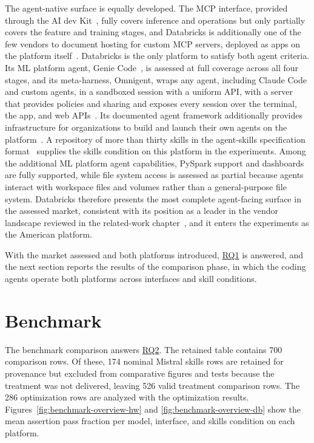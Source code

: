 \documentclass[
english,                 %
bibtex,                  %
]{kththesis}
\newcommand*{\retainedComparisonCount}{700}
\newcommand*{\retainedOptimizationCount}{286}
\newcommand*{\treatmentValidComparisonCount}{526}
\newcommand*{\excludedSkillCount}{174}
\numberwithin{listing}{chapter}
\begin{document}
The agent-native surface is equally developed. The \gls{MCP} interface, provided through the \gls{AI} \Gls{dev} Kit~\cite{databricks_databricks-solutionsai-dev-kit_2026}, fully covers inference and operations but only partially covers the feature and training stages, and Databricks is additionally one of the few vendors to document hosting for custom \gls{MCP} servers, deployed as apps on the platform itself~\cite{databricks_use_2026}. Databricks is the only platform to satisfy both agent criteria. Its \gls{ML} platform agent, Genie Code~\cite{wendell_introducing_2026}, is assessed at full coverage across all four stages, and its meta-harness, Omnigent, wraps any agent, including Claude Code and custom agents, in a sandboxed session with a uniform \gls{API}, with a server that provides policies and sharing and exposes every session over the terminal, the app, and web \glspl{API}~\cite{zaharia_introducing_2026, ball_altimeter_2026}. Its documented agent framework additionally provides infrastructure for organizations to build and launch their own agents on the platform~\cite{databricks_use_2026}. A repository of more than thirty skills in the agent-skills specification format~\cite{databricks_databricksdatabricks-agent-skills_2026} supplies the skills condition on this platform in the experiments. Among the additional \gls{ML} platform agent capabilities, PySpark support and dashboards are fully supported, while file system access is assessed as partial because agents interact with workspace files and volumes rather than a general-purpose file system. Databricks therefore presents the most complete agent-facing surface in the assessed market, consistent with its position as a leader in the vendor landscape reviewed in the related-work chapter~\cite{jaffri_magic_2025}, and it enters the experiments as the American platform.

With the market assessed and both platforms introduced, \hyperref[rq1]{RQ1} is answered, and the next section reports the results of the comparison phase, in which the coding agents operate both platforms across interfaces and skill conditions.

\section{Benchmark}
\label{sec:results_benchmark}
\glsresetall

The benchmark comparison answers \hyperref[rq2]{RQ2}. The retained table contains \retainedComparisonCount{} comparison rows. Of these, \excludedSkillCount{} nominal Mistral skills rows are retained for provenance but excluded from comparative figures and tests because the treatment was not delivered, leaving \treatmentValidComparisonCount{} valid treatment comparison rows. The \retainedOptimizationCount{} optimization rows are analyzed with the optimization results. Figures~\ref{fig:benchmark-overview-hw} and \ref{fig:benchmark-overview-db} show the mean assertion pass fraction per model, interface, and skills condition on each platform.
\end{document}
